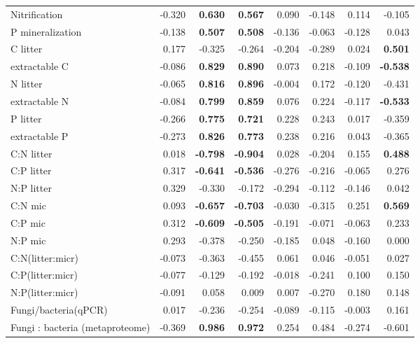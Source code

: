 \documentclass[10pt]{article}
\begin{document}
\begin{flushleft}
\begin{landscape}
\begin{table}[h!]
{\begin{tabular}{lrrrrrrr}
  Nitrification & -0.320 & \textbf{ 0.630 } & \textbf{ 0.567 } & 0.090 & -0.148 & 0.114 & -0.105 \\ 
  P mineralization & -0.138 & \textbf{ 0.507 } & \textbf{ 0.508 } & -0.136 & -0.063 & -0.128 & 0.043 \\ 
  C litter & 0.177 & -0.325 & -0.264 & -0.204 & -0.289 & 0.024 & \textbf{ 0.501 } \\ 
  extractable C & -0.086 & \textbf{ 0.829 } & \textbf{ 0.890 } & 0.073 & 0.218 & -0.109 & \textbf{ -0.538 } \\ 
  N litter & -0.065 & \textbf{ 0.816 } & \textbf{ 0.896 } & -0.004 & 0.172 & -0.120 & -0.431 \\ 
  extractable N & -0.084 & \textbf{ 0.799 } & \textbf{ 0.859 } & 0.076 & 0.224 & -0.117 & \textbf{ -0.533 } \\ 
  P litter & -0.266 & \textbf{ 0.775 } & \textbf{ 0.721 } & 0.228 & 0.243 & 0.017 & -0.359 \\ 
  extractable P & -0.273 & \textbf{ 0.826 } & \textbf{ 0.773 } & 0.238 & 0.216 & 0.043 & -0.365 \\ 
  C:N litter & 0.018 & \textbf{ -0.798 } & \textbf{ -0.904 } & 0.028 & -0.204 & 0.155 & \textbf{ 0.488 } \\ 
  C:P litter & 0.317 & \textbf{ -0.641 } & \textbf{ -0.536 } & -0.276 & -0.216 & -0.065 & 0.276 \\ 
  N:P litter & 0.329 & -0.330 & -0.172 & -0.294 & -0.112 & -0.146 & 0.042 \\ 
  C:N mic & 0.093 & \textbf{ -0.657 } & \textbf{ -0.703 } & -0.030 & -0.315 & 0.251 & \textbf{ 0.569 } \\ 
  C:P mic & 0.312 & \textbf{ -0.609 } & \textbf{ -0.505 } & -0.191 & -0.071 & -0.063 & 0.233 \\ 
  N:P mic & 0.293 & -0.378 & -0.250 & -0.185 & 0.048 & -0.160 & 0.000 \\ 
  C:N(litter:micr) & -0.073 & -0.363 & -0.455 & 0.061 & 0.046 & -0.051 & 0.027 \\ 
  C:P(litter:micr) & -0.077 & -0.129 & -0.192 & -0.018 & -0.241 & 0.100 & 0.150 \\ 
  N:P(litter:micr) & -0.091 & 0.058 & 0.009 & 0.007 & -0.270 & 0.180 & 0.148 \\ 
  Fungi/bacteria(qPCR) & 0.017 & -0.236 & -0.254 & -0.089 & -0.115 & -0.003 & 0.161 \\ 
  Fungi : bacteria (metaproteome) & -0.369 & \textbf{ 0.986 } & \textbf{ 0.972 } & 0.254 & 0.484 & -0.274 & -0.601 \\ 
   \hline
\end{tabular}
}
\end{table}\end{landscape}


\end{flushleft}
\end{document}
